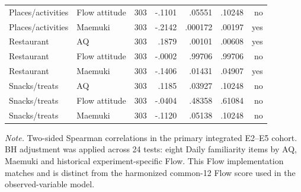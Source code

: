 \begin{longtable}{@{}>{\raggedright\arraybackslash}p{3.0cm}>{\raggedright\arraybackslash}p{2.6cm}rrrrr@{}}
Places/activities & Flow attitude & 303 & -.1101 & .05551 & .10248 & no \\
Places/activities & Maemuki & 303 & -.2142 & .000172 & .00197 & yes \\
Restaurant & AQ & 303 & .1879 & .00101 & .00608 & yes \\
Restaurant & Flow attitude & 303 & -.0002 & .99706 & .99706 & no \\
Restaurant & Maemuki & 303 & -.1406 & .01431 & .04907 & yes \\
Snacks/treats & AQ & 303 & .1185 & .03927 & .10248 & no \\
Snacks/treats & Flow attitude & 303 & -.0404 & .48358 & .61084 & no \\
Snacks/treats & Maemuki & 303 & -.1120 & .05138 & .10248 & no \\
\end{longtable}
\noindent\begin{minipage}{\textwidth}\footnotesize\textit{Note.} Two-sided Spearman correlations in the primary integrated E2--E5 cohort. BH adjustment was applied across 24 tests: eight Daily familiarity items by AQ, Maemuki and historical experiment-specific Flow. This Flow implementation matches  and is distinct from the harmonized common-12 Flow score used in the observed-variable model.\end{minipage}
\endgroup

